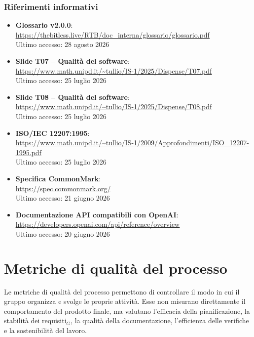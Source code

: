 \documentclass[a4paper, 10pt, colorlinks=true, linkcolor=black, urlcolor=blue, citecolor=blue, hidelinks]{article}
\newcommand{\reflink}[1]{{\footnotesize\underline{\url{#1}}}}
\begin{document}
\subsubsection{Riferimenti informativi}

\begin{itemize}
    \item \textbf{Glossario v2.0.0}: \\
    \reflink{https://thebitless.live/RTB/doc_interna/glossario/glossario.pdf} \\
    Ultimo accesso: 28 agosto 2026

    \item \textbf{Slide T07 -- Qualità del software}: \\
    \reflink{https://www.math.unipd.it/~tullio/IS-1/2025/Dispense/T07.pdf} \\
    Ultimo accesso: 25 luglio 2026

    \item \textbf{Slide T08 -- Qualità del software}: \\
    \reflink{https://www.math.unipd.it/~tullio/IS-1/2025/Dispense/T08.pdf} \\
    Ultimo accesso: 25 luglio 2026

    \item \textbf{ISO/IEC 12207:1995}: \\
    \reflink{https://www.math.unipd.it/~tullio/IS-1/2009/Approfondimenti/ISO_12207-1995.pdf} \\
    Ultimo accesso: 25 luglio 2026

    \item \textbf{Specifica CommonMark}: \\
    \reflink{https://spec.commonmark.org/} \\
    Ultimo accesso: 21 giugno 2026

    \item \textbf{Documentazione API compatibili con OpenAI}: \\
    \reflink{https://developers.openai.com/api/reference/overview} \\
    Ultimo accesso: 20 giugno 2026
\end{itemize}

\section{Metriche di qualità del processo}

Le metriche di qualità del processo permettono di controllare il modo in cui il gruppo organizza e svolge le proprie attività. Esse non misurano direttamente il comportamento del prodotto finale, ma valutano l'efficacia della pianificazione, la stabilità dei requisiti$_G$, la qualità della documentazione, l'efficienza delle verifiche e la sostenibilità del lavoro.
\end{document}
